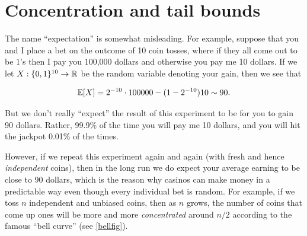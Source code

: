 \hypertarget{expprod}{}

\hypertarget{indeplem}{}


\section{Concentration and tail bounds}\label{Concentration-and-tail-bo}

The name ``expectation'' is somewhat misleading. For example, suppose
that you and I place a bet on the outcome of 10 coin tosses, where if
they all come out to be \(1\)'s then I pay you 100,000 dollars and
otherwise you pay me 10 dollars. If we let
\(X:\{0,1\}^{10} \rightarrow {\mathbb{R}}\) be the random variable denoting your
gain, then we see that

\[
\operatorname*{\mathbb E}[X] = 2^{-10}\cdot 100000 - (1-2^{-10})10 \sim 90 .
\]

But we don't really ``expect'' the result of this experiment to be for
you to gain 90 dollars. Rather, 99.9\% of the time you will pay me 10
dollars, and you will hit the jackpot 0.01\% of the times.

However, if we repeat this experiment again and again (with fresh and
hence \emph{independent} coins), then in the long run we do expect your
average earning to be close to 90 dollars, which is the reason why
casinos can make money in a predictable way even though every individual
bet is random. For example, if we toss \(n\) independent and unbiased
coins, then as \(n\) grows, the number of coins that come up ones will
be more and more \emph{concentrated} around \(n/2\) according to the
famous ``bell curve'' (see \cref{bellfig}).


